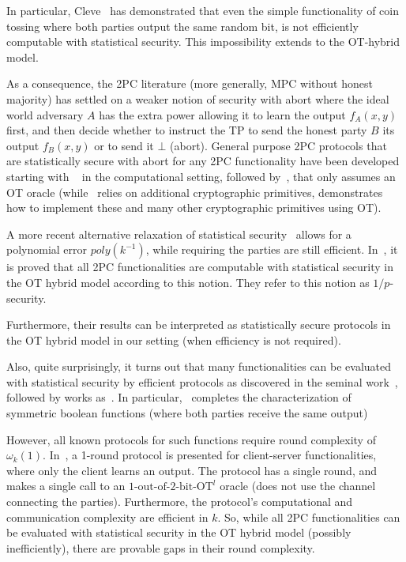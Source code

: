 \documentclass[a4paper]{article}
\newcommand{\OT}[2]{#1\text{-out-of-}#2\text{-bit-OT}}
\begin{document}
In particular, Cleve~\cite{Cleve86} has demonstrated that even the simple functionality of coin tossing where both parties output the same random bit, is not efficiently computable with statistical security. This impossibility extends to the OT-hybrid model.

As a consequence, the 2PC literature (more generally, MPC without honest majority) has settled on a weaker notion of security with abort where the ideal world adversary $A$ has the extra power allowing it to learn the output $f_A(x,y)$ first, and then decide whether to instruct the TP to send the honest party $B$ its output $f_B(x,y)$ or to send it $\bot$ (abort). General purpose 2PC protocols that are statistically secure with abort for any 2PC functionality have been developed starting with ~\cite{GMW91} in the computational setting, followed by~\cite{Killian88}, that only assumes an OT oracle (while~\cite{GMW91} relies on additional cryptographic primitives,\cite{Killian88} demonstrates how to implement these and many other cryptographic primitives using OT). 

A more recent alternative relaxation of statistical security~\cite{GK10}
allows for a polynomial error $poly(k^{-1})$, while requiring the parties are still efficient. In~\cite{GK10}, it is proved that all 2PC functionalities are computable with statistical security in the OT hybrid model according to this notion. They refer to this notion as $1/p$-security.

Furthermore, their results can be interpreted as statistically secure protocols in the OT hybrid model in our setting (when efficiency is not required).%

Also, quite surprisingly, it turns out that many functionalities can be evaluated with statistical security by efficient protocols as discovered in the seminal work~\cite{GHKL08}, followed by works as~\cite{Ash14,ABMO15}. In particular,~\cite{ABMO15} completes the characterization of symmetric boolean functions
(where both parties receive the same output)
 
However, all known protocols for such functions require round complexity of $\omega_k(1)$. In~\cite{IKOPS11}, a 1-round protocol is presented for client-server functionalities, where only the client learns an output. The protocol has a single round, and makes a single call to an  ${\OT{1}{2}}^l$ oracle (does not use the channel connecting the parties).
Furthermore, the protocol's computational and communication complexity are efficient in $k$. So, while all 2PC functionalities can be evaluated with statistical security in the OT hybrid model (possibly inefficiently), there are provable gaps in their round complexity. 
\end{document}
